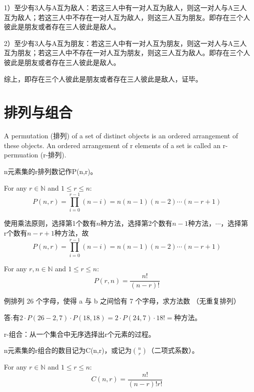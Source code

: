 \documentclass[cyan]{elegantnote}
\newcounter{example}[section]
\newcommand{\neweg}{\refstepcounter{example}\textsf{例\theexample}\quad}
\newcommand{\newans}{\textsf{答:}\quad}
\begin{document}
1）至少有3人与A互为敌人：若这三人中有一对人互为敌人，则这一对人与A三人互为敌人；若这三人中不存在一对人互为敌人，则这三人互为朋友。即存在三个人彼此是朋友或者存在三人彼此是敌人。

2）至少有3人与A互为朋友：若这三人中有一对人互为朋友，则这一对人与A三人互为朋友；若这三人中不存在一对人互为朋友，则这三人互为敌人。即存在三个人彼此是朋友或者存在三人彼此是敌人。

综上，即存在三个人彼此是朋友或者存在三人彼此是敌人，证毕。

\section{排列与组合}
\begin{newdef}[Permutation]
   A permutation (排列) of a set of distinct objects is an ordered arrangement of these objects. An ordered arrangement of r elements of a set is called an r-permuation (r-排列).

   n元素集的r排列数记作P(n,r)。
\end{newdef}

\begin{newprop}
   For any $r\in\mathbb{N}$ and $1\leq{}r\leq{}n$:
   \[P(n,r)=\prod_{i=0}^{r-1}(n-i)=n(n-1)(n-2)\cdots(n-r+1)\]
\end{newprop}

\begin{newproof}
   使用乘法原则，选择第1个数有$n$种方法，选择第2个数有$n-1$种方法，$\cdots$，选择第r个数有$n-r+1$种方法，故
   \[P(n,r)=\prod_{i=0}^{r-1}(n-i)=n(n-1)(n-2)\cdots(n-r+1)\]
\end{newproof}

\begin{newthem}
   For any $r,n\in\mathbb{N}$ and $1\leq{}r\leq{}n$:
   \[P(r,n)=\frac{n!}{(n-r)!}\]
\end{newthem}

\neweg 排列 26 个字母，使得 a 与 b 之间恰有 7 个字母，求方法数 （无重复排列）

\newans 有$2\cdot{}P(26-2,7)\cdot{}P(18,18)=2\cdot{}P(24,7)\cdot{}18! =$种方法。

\begin{newdef}[Combination]
   r-组合：从一个集合中无序选择出r个元素的过程。

   n元素集的r组合的数目记为C(n,r)，或记为$\binom n r$（二项式系数）。
\end{newdef}

\begin{newprop}
   For any $r\in\mathbb{N}$ and $1\leq{}r\leq{}n$:
   \[C(n,r)=\frac{n!}{(n-r)!r!}\]
\end{newprop}
\end{document}
